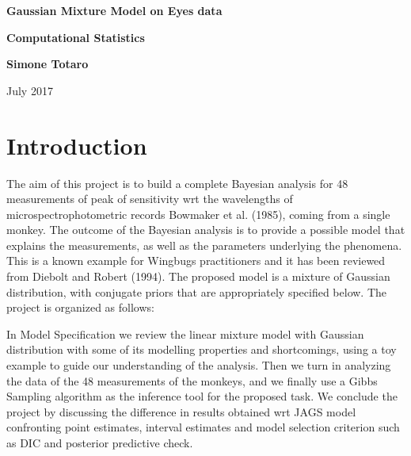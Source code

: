 \documentclass{article}
\begin{document}
\newcommand{\vect}[1]{\boldsymbol{#1}}
\begin{titlepage}

    \begin{center}
       \vspace*{1cm}
        
        \Huge
        \textbf{Gaussian Mixture Model on Eyes data}
        
        \vspace{0.5cm}
        \LARGE
        \textbf{Computational Statistics}
        
        \vspace{1.5cm}
        
        \textbf{Simone Totaro}
        
        \vfill
        
        July 2017
        
        \vspace{0.8cm}
    
    \end{center}
\end{titlepage}
\section{Introduction}
The aim of this project is to build a complete Bayesian analysis for 48 measurements of peak of sensitivity wrt the wavelengths of microspectrophotometric records Bowmaker et al. (1985), coming from a single monkey. The outcome of the Bayesian analysis is to provide a possible model that explains the measurements, as well as the parameters underlying the phenomena. This is a known example for Wingbugs practitioners and it has been reviewed from Diebolt and Robert (1994). The proposed model is a mixture of Gaussian distribution, with conjugate priors that are appropriately specified below. The project is organized as follows:

In Model Specification we review the linear mixture model with Gaussian distribution with some of its modelling properties and shortcomings, using a toy example to guide our understanding of the analysis. Then we turn in analyzing the data of the 48 measurements of the monkeys, and we finally use a Gibbs Sampling algorithm as the inference tool for the proposed task. We conclude the project by discussing the difference in results obtained wrt JAGS model confronting point estimates, interval estimates and model selection criterion such as DIC and posterior predictive check.
\end{document}
